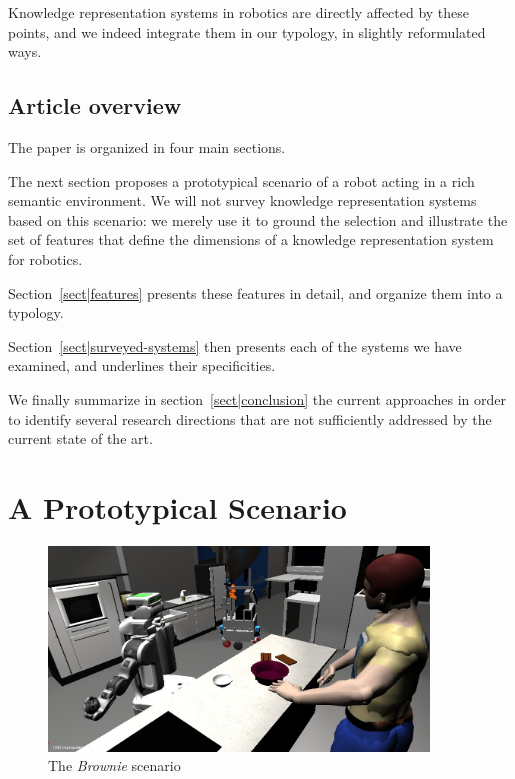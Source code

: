 \documentclass[a4paper, twocolumn]{article}
\begin{document}
Knowledge representation systems in robotics are directly affected by these
points, and we indeed integrate them in our typology, in slightly reformulated
ways.

\subsection{Article overview}
\label{sect|overview}

The paper is organized in four main sections.

The next section proposes a prototypical scenario of a robot acting in a rich
semantic environment. We will not survey knowledge representation systems based
on this scenario: we merely use it to ground the selection and illustrate the
set of features that define the dimensions of a knowledge representation system
for robotics.

Section~\ref{sect|features} presents these features in detail, and organize
them into a typology.

Section~\ref{sect|surveyed-systems} then presents each of the systems we have
examined, and underlines their specificities.

We finally summarize in section~\ref{sect|conclusion} the current approaches in
order to identify several research directions that are not sufficiently
addressed by the current state of the art.

\section{A Prototypical Scenario}
\label{sect|scenario}

\begin{figure}
	\centering
	\includegraphics[width=0.9\textwidth]{figs/brownie_scenario.jpg}
	\caption{The {\em Brownie} scenario}
	\label{fig|scenario}
\end{figure}
\end{document}
